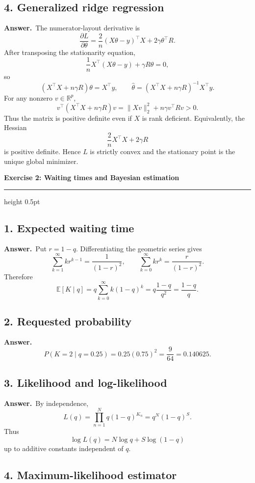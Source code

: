 \documentclass[11pt,a4paper]{article}
\newcommand{\exercise}[2]{%
  \Needspace{8\baselineskip}%
  \par\addvspace{1.1em}%
  {\Large\bfseries\color{examblue}Exercise #1: #2\par}%
  \nobreak\vspace{0.2em}%
  {\color{rulegray}\hrule height 0.5pt}%
  \vspace{0.55em}%
}
\newcommand{\answer}{\textbf{Answer.}\ }
\begin{document}
\subsection*{4. Generalized ridge regression}

\answer The numerator-layout derivative is
\[
  \frac{\partial L}{\partial\theta}
  =\frac{2}{n}(X\theta-y)^\top X+2\gamma\theta^\top R.
\]
After transposing the stationarity equation,
\[
  \frac{1}{n}X^\top(X\theta-y)+\gamma R\theta=0,
\]
so
\[
  (X^\top X+n\gamma R)\theta=X^\top y,
  \qquad
  \boxed{\widehat{\theta}
  =(X^\top X+n\gamma R)^{-1}X^\top y}.
\]
For any nonzero $v\in\mathbb{R}^p$,
\[
  v^\top(X^\top X+n\gamma R)v
  =\lVert Xv\rVert_2^2+n\gamma v^\top Rv>0.
\]
Thus the matrix is positive definite even if $X$ is rank deficient. Equivalently, the Hessian
\[
  \frac{2}{n}X^\top X+2\gamma R
\]
is positive definite. Hence $L$ is strictly convex and the stationary point is the unique global minimizer.

\exercise{2}{Waiting times and Bayesian estimation}

\subsection*{1. Expected waiting time}

\answer Put $r=1-q$. Differentiating the geometric series gives
\[
  \sum_{k=1}^{\infty}kr^{k-1}=\frac{1}{(1-r)^2},
  \qquad
  \sum_{k=0}^{\infty}kr^k=\frac{r}{(1-r)^2}.
\]
Therefore
\[
  \mathbb{E}[K\mid q]
  =q\sum_{k=0}^{\infty}k(1-q)^k
  =q\frac{1-q}{q^2}
  =\boxed{\frac{1-q}{q}}.
\]

\subsection*{2. Requested probability}

\answer
\[
  P(K=2\mid q=0.25)=0.25(0.75)^2
  =\boxed{\frac{9}{64}=0.140625}.
\]

\subsection*{3. Likelihood and log-likelihood}

\answer By independence,
\[
  L(q)=\prod_{n=1}^{N}q(1-q)^{K_n}
  =q^N(1-q)^S.
\]
Thus
\[
  \boxed{\log L(q)=N\log q+S\log(1-q)}
\]
up to additive constants independent of $q$.

\subsection*{4. Maximum-likelihood estimator}
\end{document}
